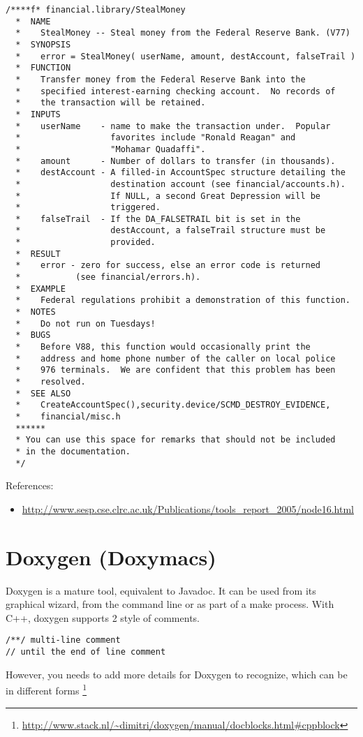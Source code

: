 \begin{verbatim}
/****f* financial.library/StealMoney
  *  NAME
  *    StealMoney -- Steal money from the Federal Reserve Bank. (V77)
  *  SYNOPSIS
  *    error = StealMoney( userName, amount, destAccount, falseTrail )
  *  FUNCTION
  *    Transfer money from the Federal Reserve Bank into the
  *    specified interest-earning checking account.  No records of
  *    the transaction will be retained.
  *  INPUTS
  *    userName    - name to make the transaction under.  Popular
  *                  favorites include "Ronald Reagan" and
  *                  "Mohamar Quadaffi".
  *    amount      - Number of dollars to transfer (in thousands).
  *    destAccount - A filled-in AccountSpec structure detailing the
  *                  destination account (see financial/accounts.h).
  *                  If NULL, a second Great Depression will be
  *                  triggered.
  *    falseTrail  - If the DA_FALSETRAIL bit is set in the
  *                  destAccount, a falseTrail structure must be
  *                  provided.
  *  RESULT
  *    error - zero for success, else an error code is returned
  *           (see financial/errors.h).
  *  EXAMPLE
  *    Federal regulations prohibit a demonstration of this function.
  *  NOTES
  *    Do not run on Tuesdays!
  *  BUGS
  *    Before V88, this function would occasionally print the
  *    address and home phone number of the caller on local police
  *    976 terminals.  We are confident that this problem has been
  *    resolved.
  *  SEE ALSO
  *    CreateAccountSpec(),security.device/SCMD_DESTROY_EVIDENCE,
  *    financial/misc.h
  ******
  * You can use this space for remarks that should not be included
  * in the documentation.
  */
\end{verbatim}

References:
\begin{itemize}
\item
  \url{http://www.sesp.cse.clrc.ac.uk/Publications/tools_report_2005/node16.html}
\end{itemize}


\section{Doxygen (Doxymacs)}
\label{sec:doxygen-doxymacs}

Doxygen is a mature tool, equivalent to Javadoc. It can be used from its
graphical wizard, from the command line or as part of a make process.
With C++, doxygen supports 2 style of comments.
\begin{verbatim}
/**/ multi-line comment
// until the end of line comment
\end{verbatim}
However, you needs to add more details for Doxygen to recognize, which can be in
different forms
\footnote{\url{http://www.stack.nl/~dimitri/doxygen/manual/docblocks.html\#cppblock}}

